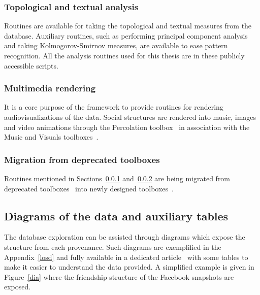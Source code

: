 \subsubsection{Topological and textual analysis}\label{ana}
Routines are available for taking the topological and textual measures from
the database.
Auxiliary routines, such as performing principal component analysis
and taking Kolmogorov-Smirnov measures, are available
to ease pattern recognition.
All the analysis routines used for this thesis are in these publicly accessible scripts.

\subsubsection{Multimedia rendering}\label{media}
It is a core purpose of the framework to provide routines for rendering
audiovisualizations of the data.
Social structures are rendered into music, images and video animations
through the Percolation toolbox~\cite{percolation} in association with
the Music and Visuals toolboxes~\cite{music,visuals}.

\subsubsection{Migration from deprecated toolboxes}
Routines mentioned in Sections~\ref{ana} and~\ref{media} are being migrated from deprecated
toolboxes~\cite{gmaneLegacy,percolationLegacy} into newly designed
toolboxes~\cite{percolation,visuals}.

\subsection{Diagrams of the data and auxiliary tables}
The database exploration can be assisted through diagrams which expose
the structure from each provenance.
Such diagrams are exemplified in the Appendix~\ref{losd} and 
fully available in a dedicated article~\cite{losd}
with some tables to make it easier to understand the data provided.
A simplified example is given in Figure~\ref{dia} where the friendship
structure of the Facebook snapshots are exposed.

